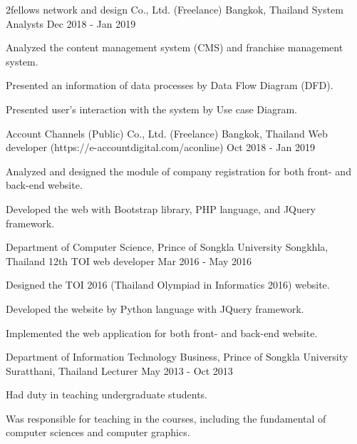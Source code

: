 
\begin{cventries}
	\cvexperience
	{2fellows network and design Co., Ltd. (Freelance)}%
	{Bangkok, Thailand}%
	{System Analysts}%
	{Dec 2018 - Jan 2019}%
	{%
		\begin{cvitem}
			\item {Analyzed the content management system (CMS) and franchise management system.}
			\item {Presented an information of data processes by Data Flow Diagram (DFD).}
			\item {Presented user's interaction with the system by Use case Diagram.}
		\end{cvitem}
	}%
	
	\cvexperience
	{Account Channels (Public) Co., Ltd. (Freelance)}%
	{Bangkok, Thailand}%
	{Web developer (https://e-accountdigital.com/aconline)}%
	{Oct 2018 - Jan 2019}%
	{%
		\begin{cvitem}
			\item {Analyzed and designed the module of company registration for both front- and back-end website.}
			\item {Developed the web with Bootstrap library, PHP language, and JQuery framework.}
		\end{cvitem}
	}%

	\cvexperience
	{Department of Computer Science, Prince of Songkla University}%
	{Songkhla, Thailand}%
	{12th TOI web developer}%
	{Mar 2016 - May 2016}%
	{%
		\begin{cvitem}
			\item {Designed the TOI 2016 (Thailand Olympiad in Informatics 2016) website.}
			\item {Developed the website by Python language with JQuery framework.}
			\item {Implemented the web application for both front- and back-end website.} 
		\end{cvitem}
	}%
	
	\cvexperience
	{Department of Information Technology Business, Prince of Songkla University}%
	{Suratthani, Thailand}%
	{Lecturer}%
	{May 2013 - Oct 2013}%
	{%
		\begin{cvitem}
			\item {Had duty in teaching undergraduate students.}
			\item {Was responsible for teaching in the courses, including the fundamental of computer sciences and computer graphics.} 
		\end{cvitem}
	}%


\end{cventries}
